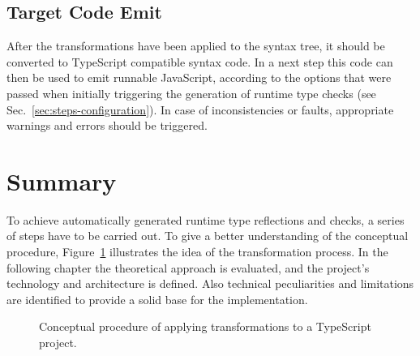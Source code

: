 \subsection{Target Code Emit}

After the transformations have been applied to the syntax tree, it should be converted to TypeScript compatible syntax code. In a next step this code can then be used to emit runnable JavaScript, according to the options that were passed when initially triggering the generation of runtime type checks (see Sec.~\ref{sec:steps-configuration}). In case of inconsistencies or faults, appropriate warnings and errors should be triggered.

\section{Summary}
\label{sec:theoretical-approach-summary}

To achieve automatically generated runtime type reflections and checks, a series of steps have to be carried out. To give a better understanding of the conceptual procedure, Figure~\ref{fig:theoretical-approach} illustrates the idea of the transformation process. In the following chapter the theoretical approach is evaluated, and the project's technology and architecture is defined. Also technical peculiarities and limitations are identified to provide a solid base for the implementation.
\begin{figure}
\centering

\caption{Conceptual procedure of applying transformations to a TypeScript project.}
\label{fig:theoretical-approach}
\end{figure}


%

